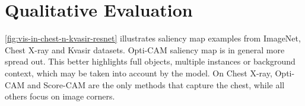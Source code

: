 \section{Qualitative Evaluation}
\label{sec:oc_qual}

\autoref{fig:vis-in-chest-n-kvasir-resnet} illustrates saliency map examples from ImageNet, Chest 
X-ray and Kvasir datasets. Opti-CAM saliency map is in general more spread out. This better 
highlights full objects, multiple instances or background context, which may be taken into account 
by the model. On Chest X-ray, Opti-CAM and Score-CAM are the only methods that capture the chest, 
while all others focus on image corners. 



